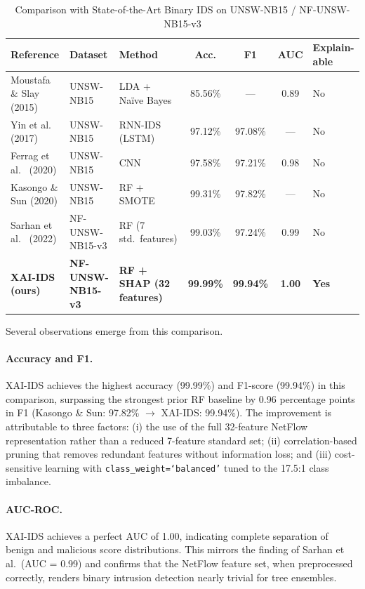 \documentclass[12pt,a4paper]{article}
\begin{document}
\begin{table}[h!]
\centering
\caption{Comparison with State-of-the-Art Binary IDS on UNSW-NB15 / NF-UNSW-NB15-v3}
\label{tab:sota_comparison}
\begin{tabular}{p{3.6cm}p{3.2cm}p{2.0cm}ccc>{\centering\arraybackslash}p{1.6cm}}
\toprule
\textbf{Reference} & \textbf{Dataset} & \textbf{Method} & \textbf{Acc.} & \textbf{F1} & \textbf{AUC} & \textbf{Explain-able} \\
\midrule
Moustafa \& Slay \cite{moustafa2015unsw} (2015)
  & UNSW-NB15            & LDA + Naïve Bayes  & 85.56\% & —       & 0.89 & No \\[4pt]
Yin et al.\ \cite{yin2017deep} (2017)
  & UNSW-NB15            & RNN-IDS (LSTM)     & 97.12\% & 97.08\% & —    & No \\[4pt]
Ferrag et al.\ \cite{ferrag2020deep} (2020)
  & UNSW-NB15            & CNN                & 97.58\% & 97.21\% & 0.98 & No \\[4pt]
Kasongo \& Sun \cite{kasongo2020} (2020)
  & UNSW-NB15            & RF + SMOTE         & 99.31\% & 97.82\% & —    & No \\[4pt]
Sarhan et al.\ \cite{sarhan2022towards} (2022)
  & NF-UNSW-NB15-v3      & RF (7 std.\ features) & 99.03\% & 97.24\% & 0.99 & No \\[6pt]
\textbf{XAI-IDS (ours)}
  & \textbf{NF-UNSW-NB15-v3} & \textbf{RF + SHAP (32 features)} & \textbf{99.99\%} & \textbf{99.94\%} & \textbf{1.00} & \textbf{Yes} \\
\bottomrule
\end{tabular}
\end{table}

Several observations emerge from this comparison.

\paragraph{Accuracy and F1.}
XAI-IDS achieves the highest accuracy (99.99\%) and F1-score (99.94\%) in this
comparison, surpassing the strongest prior RF baseline by 0.96 percentage points
in F1 (Kasongo \& Sun: 97.82\% $\rightarrow$ XAI-IDS: 99.94\%). The improvement
is attributable to three factors: (i) the use of the full 32-feature NetFlow
representation rather than a reduced 7-feature standard set; (ii) correlation-based
pruning that removes redundant features without information loss; and (iii)
cost-sensitive learning with \texttt{class\_weight=`balanced'} tuned to the
17.5:1 class imbalance.

\paragraph{AUC-ROC.}
XAI-IDS achieves a perfect AUC of 1.00, indicating complete separation of benign
and malicious score distributions. This mirrors the finding of Sarhan et al.\
(AUC = 0.99) and confirms that the NetFlow feature set, when preprocessed
correctly, renders binary intrusion detection nearly trivial for tree ensembles.
\end{document}

